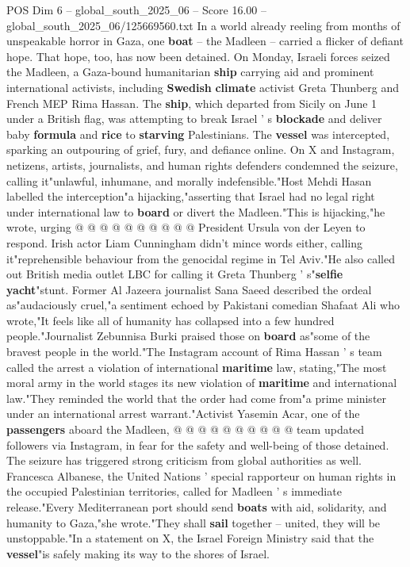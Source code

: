 \begin{textsample}{POS Dim 6 – global\_south\_2025\_06 – Score 16.00 – global\_south\_2025\_06/125669560.txt}  \label{ex:f6_pos_008}
In a world already reeling from months of unspeakable horror in Gaza, one \textbf{boat} -- the Madleen -- carried a flicker of defiant hope.
That hope, too, has now been detained.
On Monday, Israeli forces seized the Madleen, a Gaza-bound humanitarian \textbf{ship} carrying aid and prominent international activists, including \textbf{Swedish} \textbf{climate} activist Greta Thunberg and French MEP Rima Hassan.
The \textbf{ship}, which departed from Sicily on June 1 under a British flag, was attempting to break Israel ' s \textbf{blockade} and deliver baby \textbf{formula} and \textbf{rice} to \textbf{starving} Palestinians.
The \textbf{vessel} was intercepted, sparking an outpouring of grief, fury, and defiance online.
On X and Instagram, netizens, artists, journalists, and human rights defenders condemned the seizure, calling it"unlawful, inhumane, and morally indefensible."Host Mehdi Hasan labelled the interception"a hijacking,"asserting that Israel had no legal right under international law to \textbf{board} or divert the Madleen."This is hijacking,"he wrote, urging @ @ @ @ @ @ @ @ @ @ President Ursula von der Leyen to respond.
Irish actor Liam Cunningham didn't mince words either, calling it"reprehensible behaviour from the genocidal regime in Tel Aviv."He also called out British media outlet LBC for calling it Greta Thunberg ' s"\textbf{selfie} \textbf{yacht}"stunt.
Former Al Jazeera journalist Sana Saeed described the ordeal as"audaciously cruel,"a sentiment echoed by Pakistani comedian Shafaat Ali who wrote,"It feels like all of humanity has collapsed into a few hundred people."Journalist Zebunnisa Burki praised those on \textbf{board} as"some of the bravest people in the world."The Instagram account of Rima Hassan ' s team called the arrest a violation of international \textbf{maritime} law, stating,"The most moral army in the world stages its new violation of \textbf{maritime} and international law."They reminded the world that the order had come from"a prime minister under an international arrest warrant."Activist Yasemin Acar, one of the \textbf{passengers} aboard the Madleen, @ @ @ @ @ @ @ @ @ @ team updated followers via Instagram, in fear for the safety and well-being of those detained.
The seizure has triggered strong criticism from global authorities as well.
Francesca Albanese, the United Nations ' special rapporteur on human rights in the occupied Palestinian territories, called for Madleen ' s immediate release."Every Mediterranean port should send \textbf{boats} with aid, solidarity, and humanity to Gaza,"she wrote."They shall \textbf{sail} together -- united, they will be unstoppable."In a statement on X, the Israel Foreign Ministry said that the \textbf{vessel}"is safely making its way to the shores of Israel.

\end{textsample}
